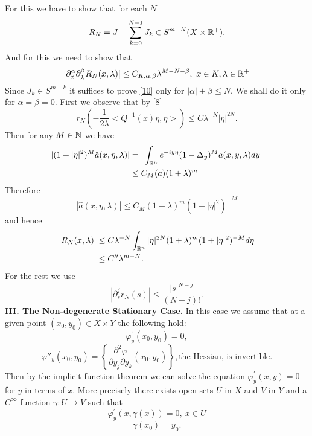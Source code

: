 \documentclass[12pt,reqno]{amsart}
\theoremstyle{plain}  %
\theoremstyle{definition}
\newcommand{\nin}{\noindent}
\newcommand{\vph}{\varphi}
\begin{document}
For this we have to show that for each $ N $ \
$$R_N = J - \sum^{N-1}_{k=0} J_k \in S^{m-N} (X \times \Bbb R^+). $$
And for this we need to show that
\begin{equation}
	\label{10}
	|\partial^\alpha_x \partial^\beta_\lambda R_N (x, \lambda) | \le C_{K, \alpha,
\beta} \lambda^{M-N-\beta}, \ x \in K, \lambda \in \Bbb R^+ 
\end{equation}
Since $ J_k \in S^{m-k} $  it suffices to prove \eqref{10} only for  $ |\alpha| + \beta \le N$. 
We shall do it only for $ \alpha = \beta = 0$.  First we observe that by
\eqref{8}
$$r_N \left ( - \frac{1}{2 \lambda} <Q^{-1} (x) \eta, \eta > \right ) \le C
\lambda^{-N} |\eta|^{2N}.$$
Then for any $ M \in \Bbb N $ we have
\begin{align*}
|(1 + |\eta|^2)^M \hat a(x, \eta, \lambda) | &= | \int_{\Bbb R^n} e^{-iy\eta}
(1-\Delta_y)^M a(x, y, \lambda) dy |\\
&\le C_M (a) (1 + \lambda)^m \end{align*}
Therefore 
$$|\hat a(x, \eta, \lambda)| \le C_M (1 + \lambda)^m (1 + |\eta|^2)^{-M}$$
and hence
\begin{align*}
|R_N(x, \lambda)| &\le C \lambda^{-N} \int_{\Bbb R^n} |\eta|^{2N} (1 +
\lambda)^m (1 + |\eta|^2)^{-M} d \eta\\
&\le C^{\prime \prime} \lambda^{m-N}. \end{align*}
For the rest we use
$$\left | \partial^j_s r_N (s) \right | \le \frac{|s|^{N-j}}{(N-j)!}. $$
\vskip0.1in
\nin
{\bf III. The Non-degenerate Stationary Case.}  In this case we assume that at a
given point $ (x_0, y_0) \in X \times Y $ the following hold:
\begin{equation}
	\label{11}
	\vph^\prime_y (x_0, y_0) = 0,
\end{equation}
\begin{equation}
	\label{12}
	\vph''_y (x_0, y_0)=\left \{ \frac{\partial^2 \vph}{\partial y_j
\partial y_k } (x_0, y_0) \right \}, \text{the Hessian,  is invertible.}
\end{equation}
Then by the implicit function theorem we can solve the equation $
\vph^\prime_y (x,y) = 0 $ for $ y $ in terms of $ x$.  More precisely there
exists open sets $ U $ in $ X $ and $ V $ in $ Y $ and a $ C^\infty $ function $
\gamma: U \longrightarrow V $ such that
\begin{equation}
	\label{13}
	\vph^\prime_y (x, \gamma(x)) = 0, \ x \in U 
\end{equation}
\begin{equation}
	\label{14}
\gamma(x_0) = y_0. 
\end{equation}
\end{document}
